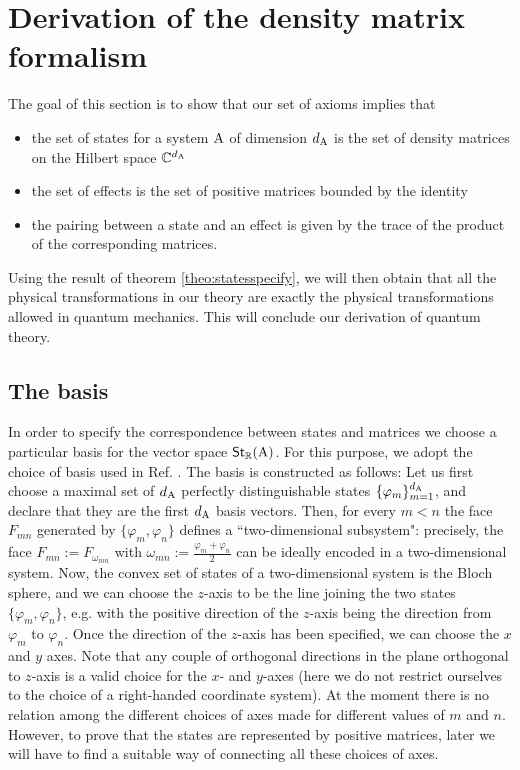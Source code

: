 \documentclass[12pt,aps,pra,showpacs,groupedaddress]{revtex4-1}
\def\Cmplx{\mathbb C}
\def\Stset{{\mathsf{St}}}
\def\Reals{{\mathbb R}}
\begin{document}
\section{Derivation of the density matrix formalism}\label{sec:matrix}

The goal of this section is to show that our set of axioms implies that
\begin{itemize}
\item the set of states for a
system ${\rm A}$ of dimension $d_{{\rm A}}$ is the set of density matrices on the Hilbert space
$\Cmplx^{d_\rA}$
\item  the set of effects is the set of positive matrices bounded by the identity
\item the pairing between a state and an effect is given by the trace of the product of the
corresponding matrices.
\end{itemize}
Using the result of theorem \ref{theo:statesspecify}, we will then obtain that all the physical transformations in our theory are exactly the physical transformations allowed in quantum mechanics.   This will conclude our derivation of quantum theory.  



\subsection{The basis}\label{subsec:basis}

In order to specify the correspondence between states and matrices we choose a particular basis for
the vector space $\Stset_\Reals (\rA)$.  For this purpose, we adopt the choice of basis used in Ref. \cite{Har01}. The basis is constructed as follows: Let us first choose a
maximal set of $d_{\rm A}$ perfectly distinguishable states $\{\varphi_m\}_{m=1}^{d_{\rm A}}$, and declare
that they are the first $d_{\rm A}$ basis vectors.  Then, for every $m<n$ the face $F_{mn}$ generated
by $\{\varphi_m, \varphi_n\}$ defines a ``two-dimensional subsystem": precisely, the face $F_{mn}:=
F_{\omega_{mn}}$ with $\omega_{mn} :={\frac{\varphi_m+ \varphi_n} 2}$ can be ideally encoded in a
two-dimensional system.  Now, the convex set of states of a two-dimensional system is the Bloch
sphere, and we can choose the $z$-axis to be the line joining the two states $\{\varphi_m,
\varphi_n\}$, e.g. with  the positive direction of the $z$-axis being the direction from $\varphi_m$
to $\varphi_n$.  Once the direction of the $z$-axis has been specified, we can choose the $x$ and
$y$ axes.  Note that any couple of orthogonal directions in the plane orthogonal to $z$-axis is a valid choice for the 
$x$- and $y$-axes (here we do not restrict ourselves to the choice of a right-handed coordinate system).  At the moment there is no relation among the different choices of axes made for
different values of $m$ and $n$. However, to prove that the states are represented by positive
matrices, later we will have to find a suitable way of connecting all these choices of axes.
\end{document}
